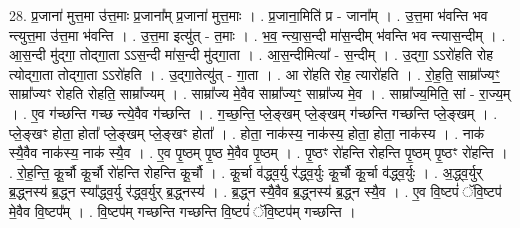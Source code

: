 \documentclass[17pt]{extarticle}
\begin{document}
28. प्र॒जाना॑ मुत्त॒मा उ॑त्त॒माः प्र॒जाना᳚म् प्र॒जाना॑ मुत्त॒माः । . प्र॒जाना॒मिति॑ प्र - जाना᳚म् । . उ॒त्त॒मा भ॑वन्ति भव न्त्युत्त॒मा उ॑त्त॒मा भ॑वन्ति । . उ॒त्त॒मा इत्यु॑त् - त॒माः । . भ॒व॒ न्त्या॒स॒न्दी मा॑स॒न्दीम् भ॑वन्ति भव न्त्यास॒न्दीम् । . आ॒स॒न्दी मु॑द्‍गा॒ तोद्‍गा॒ता ऽऽस॒न्दी मा॑स॒न्दी मु॑द्‍गा॒ता । . आ॒स॒न्दीमित्या᳚ - स॒न्दीम् । . उ॒द्‍गा॒ ऽऽरो॑हति रोह त्योद्‍गा॒ता तोद्‍गा॒ता ऽऽरो॑हति । . उ॒द्‍गा॒तेत्यु॑त् - गा॒ता । . आ रो॑हति रोह॒ त्यारो॑हति । . रो॒ह॒ति॒ साम्रा᳚ज्यꣳ॒॒ साम्रा᳚ज्यꣳ रोहति रोहति॒ साम्रा᳚ज्यम् । . साम्रा᳚ज्य मे॒वैव साम्रा᳚ज्यꣳ॒॒ साम्रा᳚ज्य मे॒व । . साम्रा᳚ज्य॒मिति॒ सां - रा॒ज्य॒म् । . ए॒व ग॑च्छन्ति गच्छ न्त्ये॒वैव ग॑च्छन्ति । . ग॒च्छ॒न्ति॒ प्ले॒ङ्‍खम् प्ले॒ङ्‍खम् ग॑च्छन्ति गच्छन्ति प्ले॒ङ्‍खम् । . प्ले॒ङ्‍खꣳ होता॒ होता᳚ प्ले॒ङ्‍खम् प्ले॒ङ्‍खꣳ होता᳚ । . होता॒ नाक॑स्य॒ नाक॑स्य॒ होता॒ होता॒ नाक॑स्य । . नाक॑ स्यै॒वैव नाक॑स्य॒ नाक॑ स्यै॒व । . ए॒व पृ॒ष्ठम् पृ॒ष्ठ मे॒वैव पृ॒ष्ठम् । . पृ॒ष्ठꣳ रो॑हन्ति रोहन्ति पृ॒ष्ठम् पृ॒ष्ठꣳ रो॑हन्ति । . रो॒ह॒न्ति॒ कू॒र्चौ कू॒र्चौ रो॑हन्ति रोहन्ति कू॒र्चौ । . कू॒र्चा व॑द्ध्व॒र्यु र॑द्ध्व॒र्युः कू॒र्चौ कू॒र्चा व॑द्ध्व॒र्युः । . अ॒द्ध्व॒र्युर् ब्र॒द्ध्नस्य॑ ब्र॒द्ध्न स्या᳚द्ध्व॒र्यु र॑द्ध्व॒र्युर् ब्र॒द्ध्नस्य॑ । . ब्र॒द्ध्न स्यै॒वैव ब्र॒द्ध्नस्य॑ ब्र॒द्ध्न स्यै॒व । . ए॒व वि॒ष्टपं॑ ॅवि॒ष्टप॑ मे॒वैव वि॒ष्टप᳚म् । . वि॒ष्टप॑म् गच्छन्ति गच्छन्ति वि॒ष्टपं॑ ॅवि॒ष्टप॑म् गच्छन्ति । \newline
\end{document}
